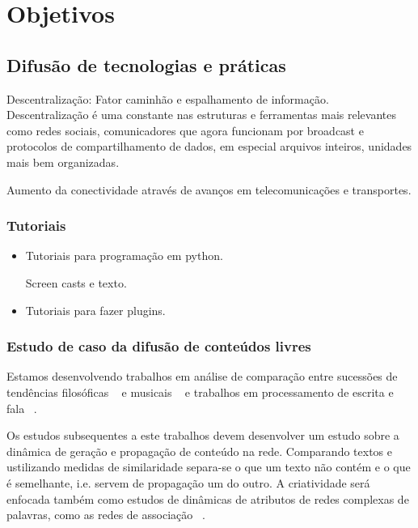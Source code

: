 \section{Objetivos}
\label{sec:objetivos}


\subsection{Difusão de tecnologias e práticas}
\label{sec:tutoriais}

Descentralização: Fator caminhão e espalhamento de informação. Descentralização
é uma constante nas estruturas e ferramentas mais relevantes como redes
sociais, comunicadores que agora funcionam por broadcast e protocolos de
compartilhamento de dados, em especial arquivos inteiros, unidades mais
bem organizadas.

Aumento da conectividade através de avanços em telecomunicações e transportes.

\subsubsection{Tutoriais}
\label{sec:uso_sl}

\begin{itemize}
    \item Tutoriais para programação em python.

Screen casts e texto.

    \item Tutoriais para fazer plugins.
\end{itemize}

\subsubsection{Estudo de caso da difusão de conteúdos livres}
\label{sec:dif_sl}

Estamos desenvolvendo trabalhos em análise de comparação
entre sucessões de tendências filosóficas ~\cite{philome} e
musicais ~\cite{musime} e trabalhos em processamento de escrita
e fala ~\cite{rede-associacoes, complenet, enfmc, ifsc}.

Os estudos subsequentes a este trabalhos devem desenvolver
um estudo sobre a dinâmica de geração e propagação de conteúdo na rede.
Comparando textos e ustilizando medidas de similaridade separa-se
o que um texto não contém e o que é semelhante, i.e. servem de propagação
um do outro. A criatividade será enfocada também como estudos de dinâmicas
de atributos de redes complexas de palavras, como as redes de associação ~\cite{rede-associacoes}.


